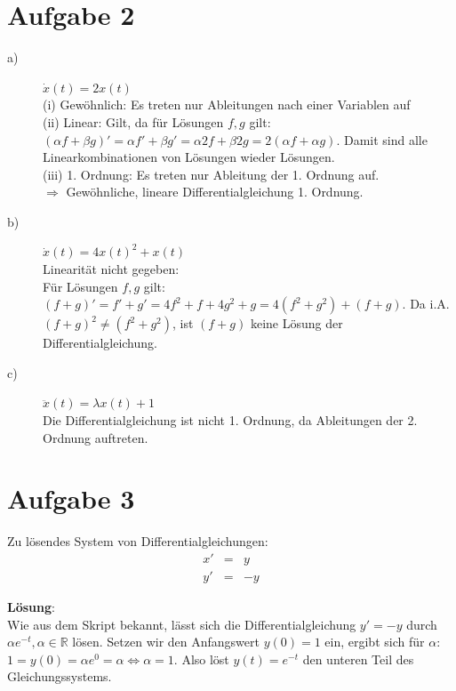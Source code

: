 \documentclass[11pt,a4paper,ngerman]{article}
\begin{document}

\section*{Aufgabe 2}

\begin{description}
\item[a)] $\dot{x}(t) = 2x(t)$ \\
(i) Gewöhnlich: Es treten nur Ableitungen nach einer Variablen auf\\

(ii) Linear: Gilt, da für Lösungen $f,g$ gilt: $(\alpha f + \beta g)' = \alpha f' + \beta g' = \alpha 2f + \beta 2g = 2 (\alpha f + \alpha g)$. Damit sind alle Linearkombinationen von Lösungen wieder Lösungen. \\

(iii) 1. Ordnung:  Es treten nur Ableitung der 1. Ordnung auf. \\
$\Rightarrow$ Gewöhnliche, lineare Differentialgleichung 1. Ordnung.
\item[b)] $\dot{x}(t) = 4x(t)^2 + x(t)$ \\
Linearität nicht gegeben:  \\
Für Lösungen $f,g$ gilt: $(f + g)' = f' + g' = 4f^2 + f + 4g^2 + g = 4(f^2 + g^2) + (f+g)$. Da i.A. $(f+g)^2 \neq (f^2 + g^2)$, ist $(f+g)$ keine Lösung der Differentialgleichung.
\item[c)] $\ddot{x}(t) = \lambda x(t) +1$\\
Die Differentialgleichung ist nicht 1. Ordnung, da Ableitungen der 2. Ordnung auftreten.
\end{description}



\section*{Aufgabe 3}
Zu lösendes System von Differentialgleichungen:
$$
\begin{array}{lcr}
x' &=& y \\
y' &=& -y
\end{array}
$$

\textbf{Lösung}:\\
Wie aus dem Skript bekannt, lässt sich die Differentialgleichung $y' = -y$ durch $\alpha e^{-t}, \alpha \in \mathbb{R}$ lösen. Setzen wir den Anfangswert $y(0) = 1$ ein, ergibt sich für $\alpha$: $1 = y(0) = \alpha e^{0} = \alpha \Leftrightarrow \alpha = 1$. Also löst $y(t) = e^{-t}$ den unteren Teil des Gleichungssystems.
\end{document}
